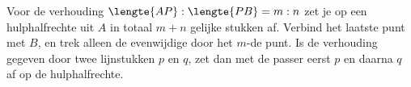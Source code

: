 \begin{werkwijze}
Voor de verhouding ${\lengte{AP} : \lengte{PB} = m : n}$ zet je op een hulphalfrechte uit $A$ in totaal $m + n$ gelijke stukken af. Verbind het laatste punt met $B$, en trek alleen de evenwijdige door het $m$-de punt. Is de verhouding gegeven door twee lijnstukken $p$ en $q$, zet dan met de passer eerst $p$ en daarna $q$ af op de hulphalfrechte.
\end{werkwijze}


\begin{oefeningen}
\end{oefeningen}


